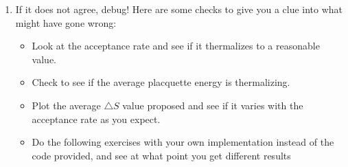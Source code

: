 \documentclass[11pt]{article}
\begin{document}
\begin{tcolorbox}
\begin{enumerate}
\item If it does not agree, debug! Here are some checks to give you a clue into what might have gone wrong:
	\begin{itemize}
	\item Look at the acceptance rate and see if it thermalizes to a reasonable value.
	\item Check to see if the average placquette energy is thermalizing.
	\item Plot the average $\triangle S$ value proposed and see if it varies with the acceptance rate as you expect.
	\item Do the following exercises with your own implementation instead of the code provided, and see at what point you get different results
	\end{itemize}
\end{enumerate}\end{tcolorbox}
\end{document}
